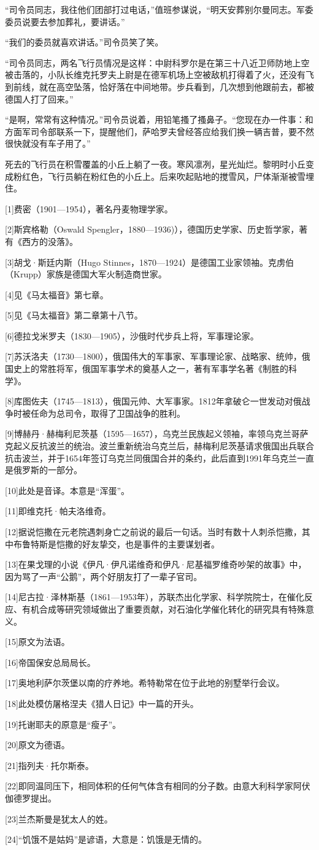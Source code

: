 “司令员同志，我往他们团部打过电话，”值班参谋说，“明天安葬别尔曼同志。军委委员说要去参加葬礼，要讲话。”

“我们的委员就喜欢讲话。”司令员笑了笑。

“司令员同志，两名飞行员情况是这样：中尉科罗尔是在第三十八近卫师防地上空被击落的，小队长维克托罗夫上尉是在德军机场上空被敌机打得着了火，还没有飞到前线，就在高空坠落，恰好落在中间地带。步兵看到，几次想到他跟前去，都被德国人打了回来。”

“是啊，常常有这种情况。”司令员说着，用铅笔搔了搔鼻子。“您现在办一件事：和方面军司令部联系一下，提醒他们，萨哈罗夫曾经答应给我们换一辆吉普，要不然很快就没有车子用了。”

死去的飞行员在积雪覆盖的小丘上躺了一夜。寒风凛冽，星光灿烂。黎明时小丘变成粉红色，飞行员躺在粉红色的小丘上。后来吹起贴地的搅雪风，尸体渐渐被雪埋住。

[1]费密（1901—1954），著名丹麦物理学家。

[2]斯宾格勒（Oswald Spengler，1880—1936)），德国历史学家、历史哲学家，著有《西方的没落》。

[3]胡戈·斯廷内斯（Hugo Stinnes，1870—1924）是德国工业家领袖。克虏伯（Krupp）家族是德国大军火制造商世家。

[4]见《马太福音》第七章。

[5]见《马太福音》第二章第十八节。

[6]德拉戈米罗夫（1830—1905），沙俄时代步兵上将，军事理论家。

[7]苏沃洛夫（1730—1800），俄国伟大的军事家、军事理论家、战略家、统帅，俄国史上的常胜将军，俄国军事学术的奠基人之一，著有军事学名著《制胜的科学》。

[8]库图佐夫（1745—1813），俄国元帅、大军事家。1812年拿破仑一世发动对俄战争时被任命为总司令，取得了卫国战争的胜利。

[9]博赫丹·赫梅利尼茨基（1595—1657），乌克兰民族起义领袖，率领乌克兰哥萨克起义反抗波兰的统治。波兰重新统治乌克兰后，赫梅利尼茨基请求俄国出兵联合抗击波兰，并于1654年签订乌克兰同俄国合并的条约，此后直到1991年乌克兰一直是俄罗斯的一部分。

[10]此处是音译。本意是“浑蛋”。

[11]即维克托·帕夫洛维奇。

[12]据说恺撒在元老院遇刺身亡之前说的最后一句话。当时有数十人刺杀恺撒，其中布鲁特斯是恺撒的好友挚交，也是事件的主要谋划者。

[13]在果戈理的小说《伊凡·伊凡诺维奇和伊凡·尼基福罗维奇吵架的故事》中，因为骂了一声“公鹅”，两个好朋友打了一辈子官司。

[14]尼古拉·泽林斯基（1861—1953年），苏联杰出化学家、科学院院士，在催化反应、有机合成等研究领域做出了重要贡献，对石油化学催化转化的研究具有特殊意义。

[15]原文为法语。

[16]帝国保安总局局长。

[17]奥地利萨尔茨堡以南的疗养地。希特勒常在位于此地的别墅举行会议。

[18]此处模仿屠格涅夫《猎人日记》中一篇的开头。

[19]托谢耶夫的原意是“瘦子”。

[20]原文为德语。

[21]指列夫·托尔斯泰。

[22]即同温同压下，相同体积的任何气体含有相同的分子数。由意大利科学家阿伏伽德罗提出。

[23]兰杰斯曼是犹太人的姓。

[24]“饥饿不是姑妈”是谚语，大意是：饥饿是无情的。
